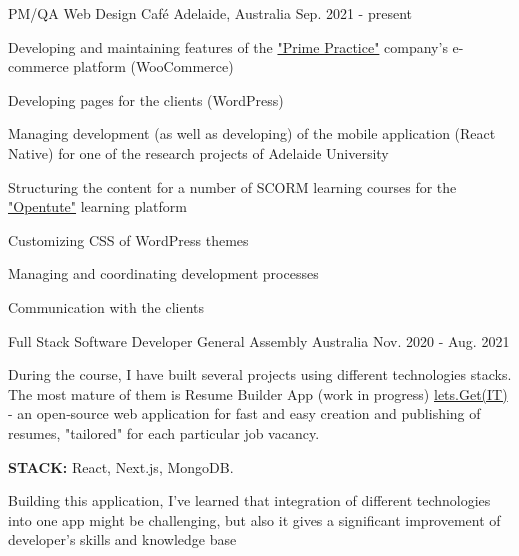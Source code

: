 

\begin{cventries}
  \cventry
    {PM/QA} %
    {Web Design Café} %
    {Adelaide, Australia} %
    {Sep. 2021 - present} %
    {
      \begin{cvitems} 
      \item {Developing and maintaining features of the \textcolor{awesome}{\href{https://primepractice.com.au}{"Prime Practice"}} company's e-commerce platform (WooCommerce)}
      \item {Developing pages for the clients (WordPress)}
      \item {Managing development (as well as developing) of the mobile application (React Native) for one of the research projects of Adelaide University}
      \item {Structuring the content for a number of SCORM learning courses for the \textcolor{awesome}{\href{https://opentute.com/}{"Opentute"}} learning platform}
      \item {Customizing CSS of WordPress themes}
      \item {Managing and coordinating development processes}
      \item {Communication with the clients}
      \end{cvitems}
    }




  \cventry
    {Full Stack Software Developer} %
    {General Assembly} %
    {Australia} %
    {Nov. 2020 - Aug. 2021} %
    {
    {\singlespacing
\begin{cvparagraph}
During the course, I have built several projects using different technologies stacks. The most mature of them is Resume Builder App (work in progress) \textcolor{awesome}{\href{https://github.com/olimstv/resume-builder-app}{lets.Get(IT)}} - an open‐source web application for fast and easy creation and publishing of resumes, "tailored" for each particular job vacancy.
\end{cvparagraph}
\begin{cvparagraph}
\textbf{STACK:} React, Next.js, MongoDB. 
\end{cvparagraph}
\begin{cvparagraph}
Building this application, I've learned that integration of different technologies into one app might be challenging, but also it gives a significant improvement of developer's skills and knowledge base
\end{cvparagraph}
    }
    }



\end{cventries}
